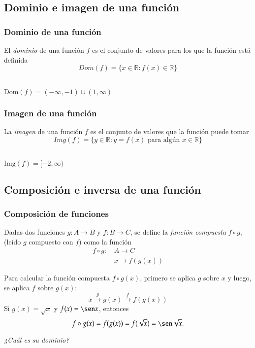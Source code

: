 \subsection{Dominio e imagen de una función}
\begin{frame}
\frametitle{Dominio de una función}
\begin{definicion}
El \emph{dominio} de una función $f$ es el conjunto de valores para los que la función está definida
\[
Dom(f)=\{x\in \mathbb{R}: f(x)\in \mathbb{R}\}
\]
\end{definicion}
\begin{center}
\scalebox{1}{}\\
$\mbox{Dom}(f)=(-\infty,-1)\cup(1,\infty)$
\end{center}
\end{frame} 


\begin{frame}
\frametitle{Imagen de una función}
\begin{definicion}
La \emph{imagen} de una función $f$ es el conjunto de valores que la función puede tomar
\[
Img(f)=\{y\in \mathbb{R}: y=f(x) \mbox{ para algún } x\in\mathbb{R}\}
\]
\end{definicion}
\begin{center}
\scalebox{1}{}\\
$\mbox{Img}(f)=[-2,\infty)$
\end{center}
\end{frame} 



\subsection{Composición e inversa de una función}
\begin{frame}
\frametitle{Composición de funciones}
\begin{definicion}
Dadas dos funciones $g:A\rightarrow B$ y $f:B\rightarrow C$, se define la \emph{función compuesta} $f\circ g$, (leído $g$ compuesto con $f$) como la función  
\begin{align*}
f\circ g:\,& A\longrightarrow C\\
& x\longrightarrow f(g(x))
\end{align*}
\end{definicion}
Para calcular la función compuesta $f\circ g(x)$, primero se aplica $g$ sobre $x$ y luego, se aplica $f$ sobre $g(x)$:
\[
x\stackrel{g}{\longrightarrow}g(x)\stackrel{f}{\longrightarrow}f(g(x))
\]
 Si $g(x)=\sqrt x$ y $f(x)=\sen x$, entonces 
\[
f\circ g(x)=f(g(x))=f(\sqrt x)=\sen \sqrt x.
\]
\begin{center}
\emph{¿Cuál es su dominio?}
\end{center}
\end{frame} 


